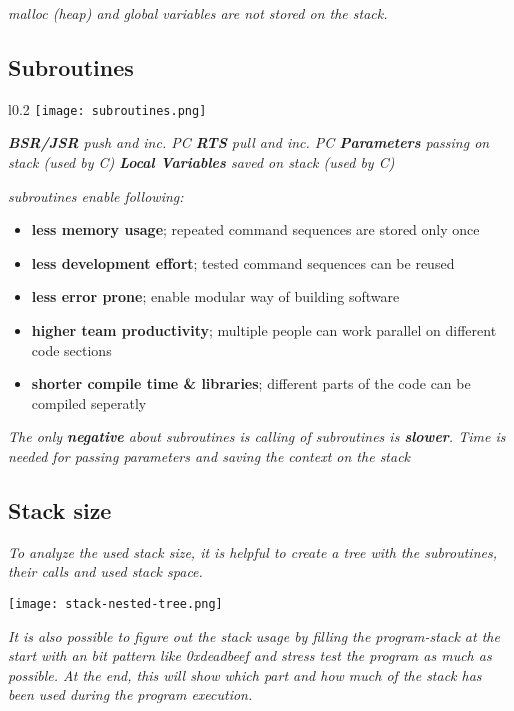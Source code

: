 \textit{malloc (heap) and global variables are not stored on the stack.}

\subsection{Subroutines}

\begin{wrapfigure}{l}{0.2\textwidth}
    \centering
    \hspace{-20pt}
    \texttt{[image: subroutines.png]}
    \hspace{-50pt}
\end{wrapfigure}

\textit{
    \newline
    \textbf{BSR/JSR} push and inc. PC \newline
    \textbf{RTS} pull and inc. PC \newline
    \textbf{Parameters} passing on stack (used by C) \newline
    \textbf{Local Variables} saved on stack (used by C) \newline
    \newline
    \newline
}

\textit{subroutines enable following:}

\begin{itemize}
    \item{\textbf{less memory usage}; repeated command sequences are stored only once}
    \item{\textbf{less development effort}; tested command sequences can be reused}
    \item{\textbf{less error prone}; enable modular way of building software}
    \item{\textbf{higher team productivity}; multiple people can work parallel on different code sections}
    \item{\textbf{shorter compile time \& libraries}; different parts of the code can be compiled seperatly}
\end{itemize}

\textit{
    The only \textbf{negative} about subroutines is calling of subroutines is
    \textbf{slower}. Time is needed for passing parameters and saving the context
    on the stack
}

\subsection{Stack size}

\textit{
    To analyze the used stack size, it is helpful to create a tree with
    the subroutines, their calls and used stack space.
}

\texttt{[image: stack-nested-tree.png]}

\textit{
    It is also possible to figure out the stack usage by filling the
    program-stack at the start with an bit pattern like 0xdeadbeef and
    stress test the program as much as possible.
    At the end, this will show which part and how much of the stack has been
    used during the program execution.
}


